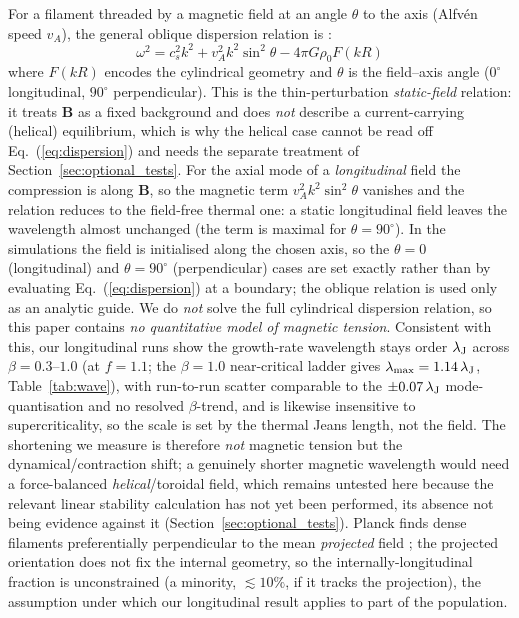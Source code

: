 \documentclass[usenatbib,twoside,twocolumn]{mnras}
\begin{document}
For a filament threaded by a magnetic field at an angle $\theta$ to the axis (Alfv\'en speed $v_A$), the general oblique dispersion relation is \citep{Nakamura1993}:
\begin{equation}
\omega^2 = c_s^2 k^2 + v_A^2 k^2 \sin^2\theta - 4\pi G\rho_0 F(kR)
\label{eq:dispersion}
\end{equation}
where $F(kR)$ encodes the cylindrical geometry and $\theta$ is the field--axis angle ($0^\circ$ longitudinal, $90^\circ$ perpendicular). This is the thin-perturbation \emph{static-field} relation: it treats $\mathbf{B}$ as a fixed background and does \emph{not} describe a current-carrying (helical) equilibrium, which is why the helical case cannot be read off Eq.~(\ref{eq:dispersion}) and needs the separate treatment of Section~\ref{sec:optional_tests}. For the axial mode of a \emph{longitudinal} field the compression is along $\mathbf{B}$, so the magnetic term $v_A^2k^2\sin^2\theta$ vanishes and the relation reduces to the field-free thermal one: a static longitudinal field leaves the wavelength almost unchanged (the term is maximal for $\theta=90^\circ$). In the simulations the field is initialised along the chosen axis, so the $\theta=0$ (longitudinal) and $\theta=90^\circ$ (perpendicular) cases are set exactly rather than by evaluating Eq.~(\ref{eq:dispersion}) at a boundary; the oblique relation is used only as an analytic guide. We do \emph{not} solve the full cylindrical dispersion relation, so this paper contains \emph{no quantitative model of magnetic tension}. Consistent with this, our longitudinal runs show the growth-rate wavelength stays order $\lambda_{\rm J}$ across $\beta=0.3$--$1.0$ (at $f=1.1$; the $\beta=1.0$ near-critical ladder gives $\lambda_{\rm max}=1.14\,\lambda_{\rm J}$, Table~\ref{tab:wave}), with run-to-run scatter comparable to the $\pm0.07\,\lambda_{\rm J}$ mode-quantisation and no resolved $\beta$-trend, and is likewise insensitive to supercriticality, so the scale is set by the thermal Jeans length, not the field. The shortening we measure is therefore \emph{not} magnetic tension but the dynamical/contraction shift; a genuinely shorter magnetic wavelength would need a force-balanced \emph{helical}/toroidal field, which remains untested here because the relevant linear stability calculation has not yet been performed, its absence not being evidence against it (Section~\ref{sec:optional_tests}). Planck finds dense filaments preferentially perpendicular to the mean \emph{projected} field \citep{Jadhav2026}; the projected orientation does not fix the internal geometry, so the internally-longitudinal fraction is unconstrained (a minority, $\lesssim10\%$, if it tracks the projection), the assumption under which our longitudinal result applies to part of the population.
\end{document}
